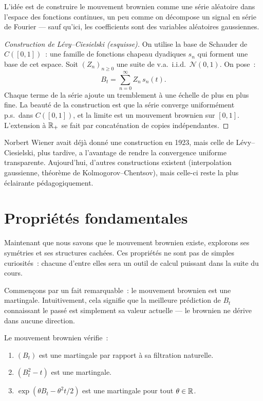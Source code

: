 L'id\'ee est de construire le mouvement brownien comme une s\'erie al\'eatoire
dans l'espace des fonctions continues, un peu comme on d\'ecompose un signal
en s\'erie de Fourier --- sauf qu'ici, les coefficients sont des variables
al\'eatoires gaussiennes.

\begin{proof}[Construction de L\'evy--Ciesielski (esquisse)]
On utilise la base de Schauder de $C([0,1])$~: une famille de fonctions
\og chapeau\fg{} dyadiques $s_n$ qui forment une base de cet espace. Soit
$(Z_n)_{n \geq 0}$ une suite de v.a.\ i.i.d.\ $\mathcal{N}(0,1)$. On pose~:
\[
  B_t = \sum_{n=0}^{\infty} Z_n \, s_n(t).
\]
Chaque terme de la s\'erie ajoute un \og tremblement\fg{} \`a une \'echelle de
plus en plus fine. La beaut\'e de la construction est que la s\'erie converge
uniform\'ement p.s.\ dans $C([0,1])$, et la limite est un mouvement brownien
sur $[0,1]$. L'extension \`a $\mathbb{R}_+$ se fait par concat\'enation de copies
ind\'ependantes.
\end{proof}

Norbert Wiener avait d\'ej\`a donn\'e une construction en 1923, mais celle de
L\'evy--Ciesielski, plus tardive, a l'avantage de rendre la convergence
uniforme transparente. Aujourd'hui, d'autres constructions existent
(interpolation gaussienne, th\'eor\`eme de Kolmogorov--Chentsov), mais
celle-ci reste la plus \'eclairante p\'edagogiquement.

\section{Propri\'et\'es fondamentales}

Maintenant que nous savons que le mouvement brownien existe, explorons ses
sym\'etries et ses structures cach\'ees. Ces propri\'et\'es ne sont pas de simples
curiosit\'es~: chacune d'entre elles sera un outil de calcul puissant dans
la suite du cours.

Commen\c{c}ons par un fait remarquable~: le mouvement brownien est une
martingale. Intuitivement, cela signifie que la meilleure pr\'ediction de
$B_t$ connaissant le pass\'e est simplement sa valeur actuelle --- le brownien
ne \og d\'erive\fg{} dans aucune direction.

\begin{proposition}
Le mouvement brownien v\'erifie~:
\begin{enumerate}
  \item $(B_t)$ est une martingale par rapport \`a sa filtration naturelle.
  \item $(B_t^2 - t)$ est une martingale.
  \item $\exp(\theta B_t - \theta^2 t/2)$ est une martingale pour tout $\theta \in \mathbb{R}$.
\end{enumerate}
\end{proposition}

